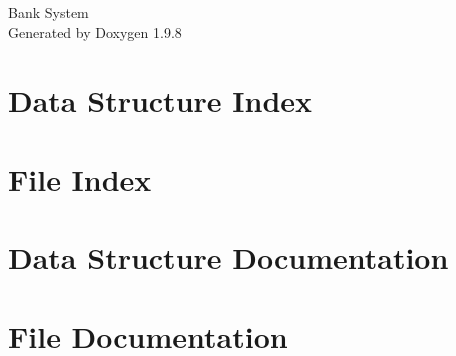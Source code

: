 \documentclass[twoside]{book}
\newcommand{\+}{\discretionary{\mbox{\scriptsize$\hookleftarrow$}}{}{}}
\newcommand{\clearemptydoublepage}{%
    \newpage{\pagestyle{empty}\cleardoublepage}%
  }
\begin{document}
  \raggedbottom
    \hypersetup{pageanchor=false,
                bookmarksnumbered=true,
                pdfencoding=unicode
               }
  \begin{titlepage}
  \vspace*{7cm}
  \begin{center}%
  {\Large Bank System}\\
  \vspace*{1cm}
  {\large Generated by Doxygen 1.9.8}\\
  \end{center}
  \end{titlepage}
  \clearemptydoublepage
  \tableofcontents
  \clearemptydoublepage
  \hypersetup{pageanchor=true}
\chapter{Data Structure Index}

\chapter{File Index}

\chapter{Data Structure Documentation}

\chapter{File Documentation}


  \backmatter
  \newpage
  \clearemptydoublepage
  \printindex
\end{document}
